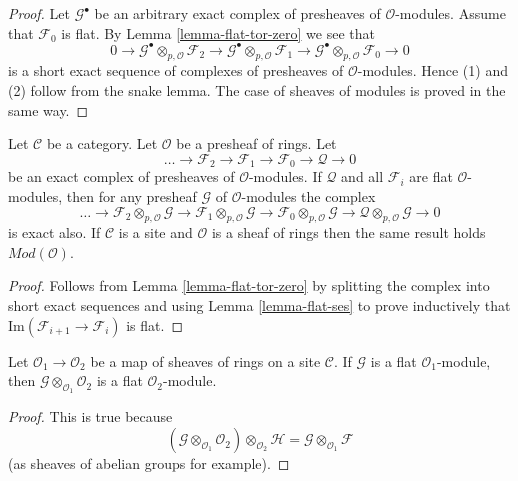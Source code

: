 \begin{proof}
Let $\mathcal{G}^\bullet$ be an arbitrary exact complex of presheaves
of $\mathcal{O}$-modules. Assume that $\mathcal{F}_0$ is flat.
By Lemma \ref{lemma-flat-tor-zero} we see that
$$
0 \to
\mathcal{G}^\bullet \otimes_{p, \mathcal{O}} \mathcal{F}_2 \to
\mathcal{G}^\bullet \otimes_{p, \mathcal{O}} \mathcal{F}_1 \to
\mathcal{G}^\bullet \otimes_{p, \mathcal{O}} \mathcal{F}_0 \to 0
$$
is a short exact sequence of complexes of presheaves of
$\mathcal{O}$-modules. Hence (1) and (2) follow from the snake lemma.
The case of sheaves of modules is proved in the same way.
\end{proof}

\begin{lemma}
\label{lemma-flat-resolution-of-flat}
Let $\mathcal{C}$ be a category.
Let $\mathcal{O}$ be a presheaf of rings.
Let
$$
\ldots \to
\mathcal{F}_2 \to
\mathcal{F}_1 \to
\mathcal{F}_0 \to
\mathcal{Q} \to 0
$$
be an exact complex of presheaves of $\mathcal{O}$-modules.
If $\mathcal{Q}$ and all $\mathcal{F}_i$ are flat $\mathcal{O}$-modules,
then for any presheaf $\mathcal{G}$ of $\mathcal{O}$-modules the
complex
$$
\ldots \to
\mathcal{F}_2 \otimes_{p, \mathcal{O}} \mathcal{G} \to
\mathcal{F}_1 \otimes_{p, \mathcal{O}} \mathcal{G} \to
\mathcal{F}_0 \otimes_{p, \mathcal{O}} \mathcal{G} \to
\mathcal{Q} \otimes_{p, \mathcal{O}} \mathcal{G} \to 0
$$
is exact also. If $\mathcal{C}$ is a site and $\mathcal{O}$ is a
sheaf of rings then the same result holds $\textit{Mod}(\mathcal{O})$.
\end{lemma}

\begin{proof}
Follows from Lemma \ref{lemma-flat-tor-zero} by splitting the complex
into short exact sequences and using Lemma \ref{lemma-flat-ses} to
prove inductively that $\text{Im}(\mathcal{F}_{i + 1} \to \mathcal{F}_i)$
is flat.
\end{proof}

\begin{lemma}
\label{lemma-flat-change-of-rings}
Let $\mathcal{O}_1 \to \mathcal{O}_2$ be a map of sheaves
of rings on a site $\mathcal{C}$. If $\mathcal{G}$ is a
flat $\mathcal{O}_1$-module, then
$\mathcal{G} \otimes_{\mathcal{O}_1} \mathcal{O}_2$
is a flat $\mathcal{O}_2$-module.
\end{lemma}

\begin{proof}
This is true because
$$
(\mathcal{G} \otimes_{\mathcal{O}_1} \mathcal{O}_2)
\otimes_{\mathcal{O}_2} \mathcal{H}
=
\mathcal{G} \otimes_{\mathcal{O}_1} \mathcal{F}
$$
(as sheaves of abelian groups for example).
\end{proof}

